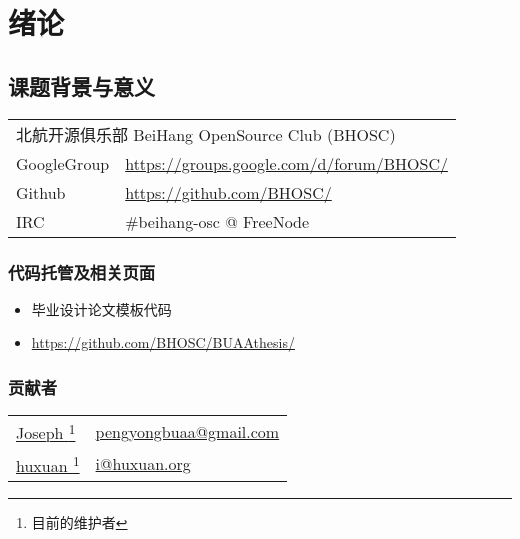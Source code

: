 \documentclass[master,openright,twoside,color,AutoFakeBold=true]{misc/buaathesis}
\begin{document}
  \mainmatter
  \pagestyle{mainmatter}
\fi

\chapter{绪论}

\section{课题背景与意义}


\begin{tabular}{ll}
    \multicolumn{2}{l}{北航开源俱乐部 BeiHang OpenSource Club (BHOSC)} \\
    GoogleGroup & \url{https://groups.google.com/d/forum/BHOSC/} \\
    Github      & \url{https://github.com/BHOSC/} \\
    IRC         & \#beihang-osc @ FreeNode
\end{tabular}

\subsection{代码托管及相关页面}
\begin{itemize}
    \item 毕业设计论文模板代码
    \item[] \url{https://github.com/BHOSC/BUAAthesis/}
\end{itemize}

\subsection{贡献者}
\begin{tabularx}{\textwidth}{@{\hspace{2em}}ll}
    \href{https://github.com/JosephPeng/}{Joseph \footnote{目前的维护者}} &
    \href{mailto:pengyongbuaa@gmail.com}{pengyongbuaa@gmail.com} \\
    \href{http://huxuan.org/}{huxuan \textsuperscript{1}} &
    \href{mailto:i@huxuan.org}{i@huxuan.org} \\
\end{tabularx}
\end{document}
